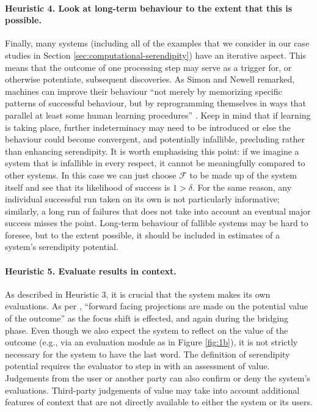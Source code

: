 \paragraph{Heuristic 4. Look at long-term behaviour to the extent that this is possible.}
\label{heur:4}
Finally, many systems (including all of the examples that we consider
in our case studies in Section \ref{sec:computational-serendipity})
have an iterative aspect.  This means that the outcome of one
processing step may serve as a trigger for, or otherwise potentiate,
subsequent discoveries.  As Simon and Newell remarked, machines can
improve their behaviour ``not merely by memorizing specific patterns
of successful behaviour, but by reprogramming themselves in ways that
parallel at least some human learning procedures''
\cite[p.~7]{simon1958heuristic}.  Keep in mind that if learning is
taking place, further indeterminacy may need to be introduced or else
the behaviour could become convergent, and potentially infallible,
precluding rather than enhancing serendipity.  It is worth emphasising
this point: if we imagine a system that is infallible in every
respect, it cannot be meaningfully compared to other systems.  In this
case we can just choose $\mathcal{F}$ to be made up of the system
itself and see that its likelihood of success is $1>\delta$.  For the
same reason, any individual successful run taken on its own is not
particularly informative; similarly, a long run of failures that does not
take into account an eventual major success misses the point.
Long-term behaviour of fallible systems may be hard to foresee,
but to the extent possible, it should be included in estimates of a
system's serendipity potential.


\paragraph{Heuristic 5. Evaluate results in context.}
\label{heur:5}
As described in Heuristic 3, it is crucial that the system makes its
own evaluations.  As per \citet[p.~7]{Makri2012a}, ``forward facing
projections are made on the potential value of the outcome'' as the
focus shift is effected, and again during the bridging phase.  Even
though we also expect the system to reflect on the value of the
outcome (e.g., via an evaluation module as in Figure \ref{fig:1b}), it
is not strictly necessary for the system to have the last word.  The
definition of serendipity potential requires the evaluator to step in
with an assessment of value.  Judgements from the user or another
party can also confirm or deny the system's evaluations.  Third-party
judgements of value may take into account additional features of
context that are not directly available to either the system or its
users.

